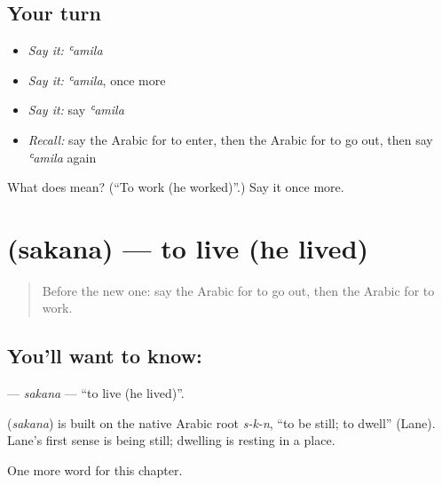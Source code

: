 \subsection*{Your turn}
\begin{itemize}
\raggedright
  \item \emph{Say it:} \emph{ʿamila}
  \item \emph{Say it:} \emph{ʿamila}, once more
  \item \emph{Say it:} say \emph{ʿamila}
  \item \emph{Recall:} say the Arabic for to enter, then the Arabic for to go out, then say \emph{ʿamila} again
\end{itemize}

\begin{tcolorbox}[breakable,colback=teal!4,colframe=teal!35!black,title={Before you move on}]
What does  mean? (\textquotedblleft{}To work (he worked)\textquotedblright{}.) Say it once more.
\end{tcolorbox}
\section[\texorpdfstring{\ar{سكن} (sakana)}{سكن (sakana)}]{ (sakana) — to live (he lived)}

\label{lesson:AR-C64-sakana}



\begin{quote}
Before the new one: say the Arabic for to go out, then the Arabic for to work.
\end{quote}

\subsection*{You'll want to know: }
\textbf{} — \emph{sakana} — \textquotedblleft{}to live (he lived)\textquotedblright{}.

\begin{cousinweb}
\textbf{} (\emph{sakana}) is built on the native Arabic root \emph{s-k-n}, \textquotedblleft{}to be still; to dwell\textquotedblright{} (Lane). Lane's first sense is being still; dwelling is resting in a place.
\end{cousinweb}

\begin{grammarlens}[title={What you've built}]
One more word for this chapter.
\end{grammarlens}

